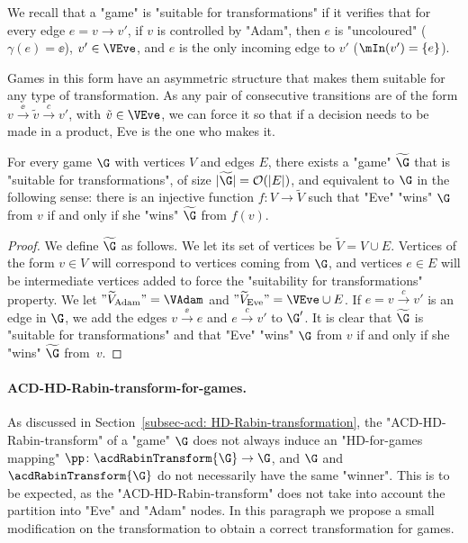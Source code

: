 \documentclass[10pt,a4paper]{amsart}
\renewcommand{\O}{\mathcal{O}}
\renewcommand{\gg}{\gamma}
\newcommand{\re}[1]{\xrightarrow{#1}}
\newcommand{\Eve}{\mathrm{Eve}}
\newcommand{\Adam}{\mathrm{Adam}}
\begin{document}
We recall that a "game" is "suitable for transformations" if it verifies that for every edge $e = v\re{}v'$, if $v$ is controlled by "Adam", then $e$ is "uncoloured" ($\gg(e)=\ee$), $v'\in \VEve$, and $e$ is the only incoming edge to $v'$ ($\mIn(v') = \{e\}$). 

Games in this form have an asymmetric structure that makes them suitable for any type of transformation. As any pair of consecutive transitions are of the form $v\re{\ee}\tilde{v}\re{c}v'$, with $\tilde{v}\in \VEve$, we can force it so that if a decision needs to be made in a product, Eve is the one who makes it.


\begin{lemma}
	For every game $\G$ with vertices $V$ and edges $E$, there exists a "game" $\widetilde{\G}$ that is "suitable for transformations", of size $|\widetilde{\G}| = \O(|E|)$, and equivalent to $\G$ in the following sense: there is an injective function $f\colon V\to \widetilde{V}$ such that "Eve" "wins" $\G$ from  $v$ if and only if she "wins" $\widetilde{\G}$ from  $f(v)$.
\end{lemma}
 \begin{proof}
 	We define $\widetilde{\G}$ as follows. We let its set of vertices be $\widetilde{V} = V \cup E$. Vertices of the form $v\in V$ will correspond to vertices coming from $\G$, and vertices $e\in E$ will be intermediate vertices added to force the "suitability for transformations" property. We let $"\widetilde {V}_\Adam" = \VAdam $ and $"\widetilde {V}_\Eve" = \VEve \cup E$. If $e=v\re{c}v'$ is an edge in $\G$, we add the edges  $v\re{\ee} e$ and $e\re{c} v'$ to $\G'$. 
 	It is clear that $\widetilde{\G}$ is "suitable for transformations" and that "Eve" "wins" $\G$ from  $v$ if and only if she "wins" $\widetilde{\G}$ from~$v$.
 \end{proof}
 
\paragraph*{ACD-HD-Rabin-transform-for-games.}
As discussed in Section~\ref{subsec-acd: HD-Rabin-transformation}, the "ACD-HD-Rabin-transform" of a "game" $\G$ does not always induce an "HD-for-games mapping" $\pp\colon \acdRabinTransform{\G} \to \G$, and $\G$ and $\acdRabinTransform{\G}$ do not necessarily have the same "winner". This is to be expected, as the "ACD-HD-Rabin-transform" does not take into account the partition into "Eve" and "Adam" nodes. In this paragraph we propose a small modification on the transformation to obtain a correct transformation for games.
\end{document}
